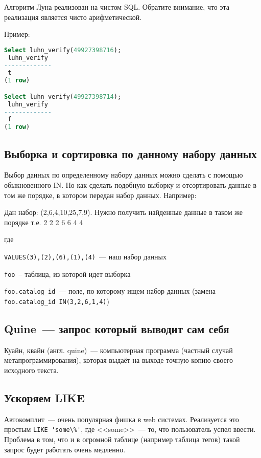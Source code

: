 Алгоритм Луна реализован на чистом SQL. Обратите внимание, что эта реализация является чисто арифметической.



Пример:

\begin{lstlisting}[language=SQL,label=lst:snippets11,caption=Алгоритм Луна. Пример]
Select luhn_verify(49927398716);
 luhn_verify
-------------
 t
(1 row)

Select luhn_verify(49927398714);
 luhn_verify
-------------
 f
(1 row)

\end{lstlisting}

\subsection{Выборка и сортировка по данному набору данных}
Выбор данных по определенному набору данных можно сделать с помощью обыкновенного IN. Но как сделать подобную выборку и отсортировать
данные в том же порядке, в котором передан набор данных. Например:

Дан набор: (2,6,4,10,25,7,9). Нужно получить найденные данные в таком же порядке т.е. 2 2 2 6 6 4 4



где

\lstinline!VALUES(3),(2),(6),(1),(4)!~--- наш набор данных

\lstinline!foo!~-- таблица, из которой идет выборка

\lstinline!foo.catalog_id!~--- поле, по которому ищем набор данных (замена \lstinline!foo.catalog_id IN(3,2,6,1,4)!)

\subsection{Quine~--- запрос который выводит сам себя}
Куайн, квайн (англ. quine)~--- компьютерная программа (частный случай метапрограммирования), которая выдаёт на выходе точную копию своего исходного текста.



\subsection{Ускоряем LIKE}
Автокомплит~--- очень популярная фишка в web системах. Реализуется это простым \lstinline!LIKE 'some\%'!, где <<some>>~--- то, что пользователь успел ввести. Проблема в том, что и в огромной таблице (например таблица тегов) такой запрос будет работать очень медленно.

